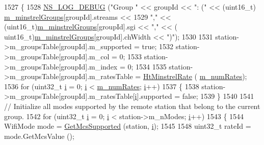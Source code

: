 \begin{DoxyCode}
1527             \{
1528               \hyperlink{group__logging_ga413f1886406d49f59a6a0a89b77b4d0a}{NS\_LOG\_DEBUG} (\textcolor{stringliteral}{"Group "} << groupId << \textcolor{stringliteral}{": ("} << (uint16\_t)
      \hyperlink{classns3_1_1MinstrelHtWifiManager_a231741ce3f38417925019aa598570468}{m\_minstrelGroups}[groupId].streams <<
1529                             \textcolor{stringliteral}{","} << (uint16\_t)\hyperlink{classns3_1_1MinstrelHtWifiManager_a231741ce3f38417925019aa598570468}{m\_minstrelGroups}[groupId].sgi << \textcolor{stringliteral}{","} << (
      uint16\_t)\hyperlink{classns3_1_1MinstrelHtWifiManager_a231741ce3f38417925019aa598570468}{m\_minstrelGroups}[groupId].chWidth << \textcolor{stringliteral}{")"});
1530 
1531               station->m\_groupsTable[groupId].m\_supported = \textcolor{keyword}{true};                                
1532               station->m\_groupsTable[groupId].m\_col = 0;
1533               station->m\_groupsTable[groupId].m\_index = 0;
1534 
1535               station->m\_groupsTable[groupId].m\_ratesTable = \hyperlink{namespacens3_a82a9f8aa0dbfba7f85c109bb124ff5b3}{HtMinstrelRate} (
      \hyperlink{classns3_1_1MinstrelHtWifiManager_a2f3d0e7f6c298a40dbc8699805103142}{m\_numRates});        
1536               \textcolor{keywordflow}{for} (uint32\_t \hyperlink{bernuolliDistribution_8m_a6f6ccfcf58b31cb6412107d9d5281426}{i} = 0; \hyperlink{bernuolliDistribution_8m_a6f6ccfcf58b31cb6412107d9d5281426}{i} < \hyperlink{classns3_1_1MinstrelHtWifiManager_a2f3d0e7f6c298a40dbc8699805103142}{m\_numRates}; \hyperlink{bernuolliDistribution_8m_a6f6ccfcf58b31cb6412107d9d5281426}{i}++)
1537                 \{
1538                   station->m\_groupsTable[groupId].m\_ratesTable[\hyperlink{bernuolliDistribution_8m_a6f6ccfcf58b31cb6412107d9d5281426}{i}].supported = \textcolor{keyword}{false};
1539                 \}
1540 
1541               \textcolor{comment}{// Initialize all modes supported by the remote station that belong to the current group.}
1542               \textcolor{keywordflow}{for} (uint32\_t \hyperlink{bernuolliDistribution_8m_a6f6ccfcf58b31cb6412107d9d5281426}{i} = 0; \hyperlink{bernuolliDistribution_8m_a6f6ccfcf58b31cb6412107d9d5281426}{i} < station->m\_nModes; \hyperlink{bernuolliDistribution_8m_a6f6ccfcf58b31cb6412107d9d5281426}{i}++)
1543                 \{
1544                   WifiMode mode = \hyperlink{classns3_1_1WifiRemoteStationManager_af21ecff608cea2837c1af9385bbe6e4e}{GetMcsSupported} (station, \hyperlink{bernuolliDistribution_8m_a6f6ccfcf58b31cb6412107d9d5281426}{i});
1545 
1548                   uint32\_t rateId = mode.GetMcsValue ();

\end{DoxyCode}
